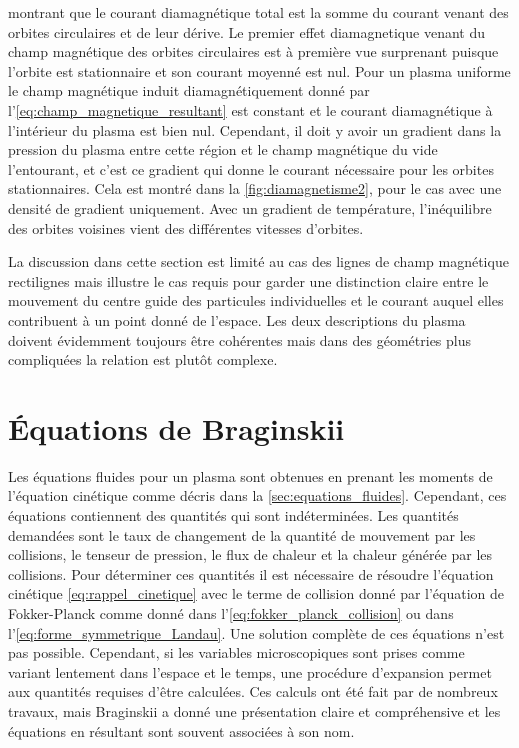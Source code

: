 \documentclass[main.tex]{subfiles}
\begin{document}
\nit montrant que le courant diamagnétique total est la somme du courant venant des orbites circulaires et de leur dérive.
Le premier effet diamagnetique venant du champ magnétique des orbites circulaires est à première vue surprenant puisque l'orbite est stationnaire et son courant moyenné est nul.
Pour un plasma uniforme le champ magnétique induit diamagnétiquement donné par l'\autoref{eq:champ_magnetique_resultant} est constant et le courant diamagnétique à l'intérieur du plasma est bien nul.
Cependant, il doit y avoir un gradient dans la pression du plasma entre cette région et le champ magnétique du vide l'entourant, et c'est ce gradient qui donne le courant nécessaire pour les orbites stationnaires.
Cela est montré dans la \autoref{fig:diamagnetisme2}, pour le cas avec une densité de gradient uniquement.
Avec un gradient de température, l'inéquilibre des orbites voisines  vient des différentes vitesses d'orbites.

La discussion dans cette section est limité au cas des lignes de champ magnétique rectilignes mais illustre le cas requis pour garder une distinction claire entre le mouvement du centre guide des particules individuelles et le courant auquel elles contribuent à un point donné de l'espace.
Les deux descriptions du plasma doivent évidemment toujours être cohérentes mais dans des géométries plus compliquées la relation est plutôt complexe.

\section{Équations de Braginskii}

Les équations fluides pour un plasma sont obtenues en prenant les moments de l'équation cinétique comme décris dans la \autoref{sec:equations_fluides}.
Cependant, ces équations contiennent des quantités qui sont indéterminées.
Les quantités demandées sont le taux de changement de la quantité de mouvement par les collisions, le tenseur de pression, le flux de chaleur et la chaleur générée par les collisions.
Pour déterminer ces quantités il est nécessaire de résoudre l'équation cinétique \ref{eq:rappel_cinetique} avec le terme de collision donné par l'équation de Fokker-Planck comme donné dans l'\autoref{eq:fokker_planck_collision} ou dans l'\autoref{eq:forme_symmetrique_Landau}.
Une solution complète de ces équations n'est pas possible.
Cependant, si les variables microscopiques sont prises comme variant lentement dans l'espace et le temps, une procédure d'expansion permet aux quantités requises d'être calculées.
Ces calculs ont été fait par de nombreux travaux, mais Braginskii a donné une présentation claire et compréhensive et les équations en résultant sont souvent associées à son nom.
\end{document}
